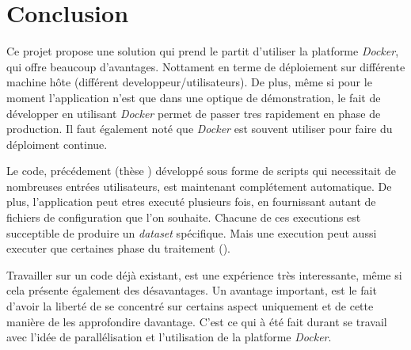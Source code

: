 \chapter{Conclusion}
\label{ch:conclusion}

Ce projet propose une solution qui prend le partit d'utiliser la platforme \emph{Docker}, qui offre beaucoup d'avantages. Nottament en terme de déploiement sur différente machine hôte (différent developpeur/utilisateurs). De plus, même si pour le moment l'application n'est que dans une optique de démonstration, le fait de développer en utilisant \emph{Docker} permet de passer tres rapidement en phase de production. Il faut également noté que \emph{Docker} est souvent utiliser pour faire du déploiment continue.

Le code, précédement (thèse \thLeite) développé sous forme de scripts qui necessitait de nombreuses entrées utilisateurs, est maintenant complétement automatique. De plus, l'application peut etres executé plusieurs fois, en fournissant autant de fichiers de configuration que l'on souhaite. Chacune de ces executions est succeptible de produire un \emph{dataset} spécifique. Mais une execution peut aussi executer que certaines phase du traitement (\thLeite).

Travailler sur un code déjà existant, est une expérience très interessante, même si cela présente également des désavantages. Un avantage important, est le fait d'avoir la liberté de se concentré sur certains aspect uniquement et de cette manière de les approfondire davantage. C'est ce qui à été fait durant se travail avec l'idée de parallélisation et l'utilisation de la platforme \emph{Docker}.

